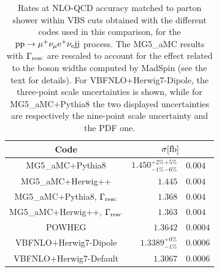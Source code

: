 \begin{table}[h!]
    \centering
    \begin{tabular}{c|r@{ $\pm$ }l}
      Code  &  \multicolumn{2}{c}{$\sigma[\rm{fb}]$}  \\
        \hline\hline
        {\sc MG5\_aMC}+{\sc Pythia8}&  $1.450 ^{+2\%}_{-1\%} {}^{+5\%}_{-6\%} $ & $0.004$  \\
        {\sc MG5\_aMC}+{\sc Herwig++}&  $1.445 $ & $0.004$  \\
        {\sc MG5\_aMC}+{\sc Pythia8}, $\Gamma_{\rm resc}$&  $1.368$ & $0.004$  \\
        {\sc MG5\_aMC}+{\sc Herwig++}, $\Gamma_{\rm resc}$&  $1.363$ & $0.004$  \\
        {\sc POWHEG}  &  $1.3642$ & $0.0004$  \\
        {\sc VBFNLO}+{\sc Herwig7-Dipole} &  $1.3389 ^{+0\%}_{-1\%}$ & $0.0006$  \\
        {\sc VBFNLO}+{\sc Herwig7-Default} &  $1.3067$ & $0.0006$  \\
    \end{tabular}
    \caption{\label{tab:PSratesNLO} Rates at NLO-QCD  accuracy matched to parton shower within VBS cuts obtained with the different codes used in this comparison,
    for the ${\rm p}{\rm p}\to\mu^+\nu_\mu{\rm e}^+\nu_{\rm e}{\rm j}{\rm j}$ process. The {\sc MG5\_aMC} results with $\Gamma_{\rm resc}$ 
    are rescaled to account for the effect related to the boson widths computed by {\sc MadSpin} (see the text for details). For
    {\sc VBFNLO}+{\sc Herwig7-Dipole}, the three-point scale uncertainties is shown, while for  {\sc MG5\_aMC}+{\sc Pythia8} the two displayed uncertainties
are respectively the nine-point scale uncertainty and the PDF one.}
\end{table}

